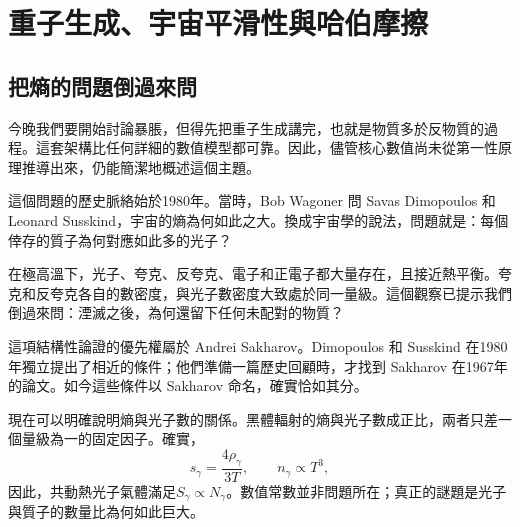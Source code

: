 \chapter{重子生成、宇宙平滑性與哈伯摩擦}


\section{把熵的問題倒過來問}

今晚我們要開始討論暴脹，但得先把重子生成講完，也就是物質多於反物質的過程。這套架構比任何詳細的數值模型都可靠。因此，儘管核心數值尚未從第一性原理推導出來，仍能簡潔地概述這個主題。

這個問題的歷史脈絡始於1980年。當時，Bob Wagoner 問 Savas Dimopoulos 和 Leonard Susskind，宇宙的熵為何如此之大。換成宇宙學的說法，問題就是：每個倖存的質子為何對應如此多的光子？

在極高溫下，光子、夸克、反夸克、電子和正電子都大量存在，且接近熱平衡。夸克和反夸克各自的數密度，與光子數密度大致處於同一量級。這個觀察已提示我們倒過來問：湮滅之後，為何還留下任何未配對的物質？

這項結構性論證的優先權屬於 Andrei Sakharov。Dimopoulos 和 Susskind 在1980年獨立提出了相近的條件；他們準備一篇歷史回顧時，才找到 Sakharov 在1967年的論文。如今這些條件以 Sakharov 命名，確實恰如其分。

現在可以明確說明熵與光子數的關係。黑體輻射的熵與光子數成正比，兩者只差一個量級為一的固定因子。確實，
\begin{equation}
s_\gamma=\frac{4\rho_\gamma}{3T},
\qquad
n_\gamma\propto T^3,
\end{equation}
因此，共動熱光子氣體滿足\(S_\gamma\propto N_\gamma\)。數值常數並非問題所在；真正的謎題是光子與質子的數量比為何如此巨大。

\begin{classroomqa}
\end{classroomqa}

